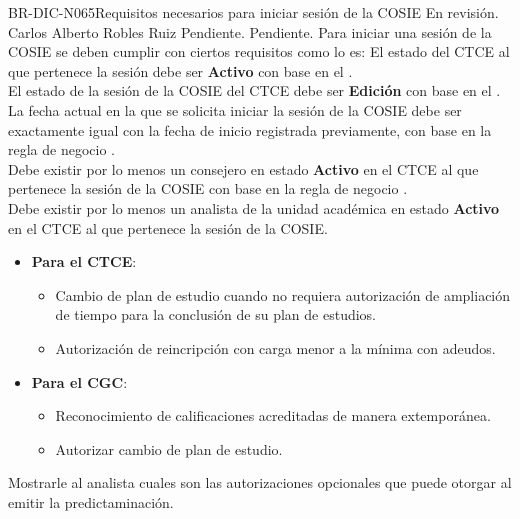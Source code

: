 \begin{BusinessRule}{BR-DIC-N065}{Requisitos necesarios para iniciar sesión de la COSIE}
	{\bcCondition} %
	{\btEnabler}     %
	{\blControlling}     %
	\BRItem[Estado] En revisión.
	 Carlos Alberto Robles Ruiz
	 Pendiente.
	 Pendiente. 
	\BRItem[Descripción] Para iniciar una sesión de la COSIE se deben cumplir con ciertos requisitos como lo es:
	El estado del CTCE al que pertenece la sesión debe ser \textbf{Activo} con base en el .\\
	
	 El estado de la sesión de la COSIE del CTCE debe ser \textbf{Edición} con base en el . \\
	 
	 La fecha actual en la que se solicita iniciar la sesión de la COSIE debe ser exactamente igual con la fecha de inicio registrada previamente, con base en la regla de negocio . \\
	 
	Debe existir por lo menos un consejero en estado  \textbf{Activo} en el CTCE al que pertenece la sesión de la COSIE con base en la regla de negocio . \\
	
	 Debe existir por lo menos un analista de la unidad académica en estado  \textbf{Activo} en el CTCE al que pertenece la sesión de la COSIE. 
	\begin{itemize}
		\item \textbf{Para el CTCE}:
		\begin{itemize}
			\item Cambio de plan de estudio cuando no requiera autorización de ampliación de tiempo para la conclusión de su plan de estudios.
			\item Autorización de reincripción con carga menor a la mínima con adeudos.
		\end{itemize}
		\item \textbf{Para el CGC}:
		\begin{itemize}
			\item Reconocimiento de calificaciones acreditadas de manera extemporánea.
			\item Autorizar cambio de plan de estudio.
		\end{itemize}
	\end{itemize}
	\BRItem[Motivación] Mostrarle al analista cuales son las autorizaciones opcionales que puede otorgar al emitir la predictaminación.
\end{BusinessRule}

